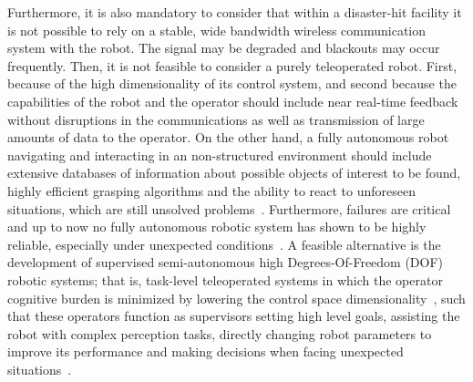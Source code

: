 	Furthermore, it is also mandatory to consider that within a disaster-hit facility it is not possible
	to rely on a stable, wide bandwidth wireless communication system with the robot.
	The signal may be degraded and blackouts may occur frequently.
	Then, it is not feasible to consider a purely teleoperated robot.
	First, because of the high dimensionality of its control system, and second because the capabilities of
	the robot and the operator should include near real-time feedback without disruptions in the communications
	as well as transmission of large amounts of data to the operator.
	On the other hand, a fully autonomous robot navigating and interacting in an non-structured environment
	should include extensive databases of information about possible objects of interest to be found,
	highly efficient grasping algorithms and the ability to react to unforeseen situations,
	which are still unsolved problems~\cite{Romay}.
	Furthermore, failures are critical and up to now no fully autonomous robotic system has shown to be highly
	reliable,	especially under unexpected conditions~\cite{Stormont}.
	A feasible alternative is the development of supervised semi-autonomous high Degrees-Of-Freedom (DOF)
	robotic systems; that is, task-level teleoperated systems in which the operator cognitive burden is
	minimized by lowering the control space dimensionality~\cite{Katyal}, such that these operators function
	as supervisors setting high level goals, assisting the robot with complex perception tasks, directly
	changing robot parameters to improve its performance and making decisions when facing unexpected
	situations~\cite{Kohlbrecher}.